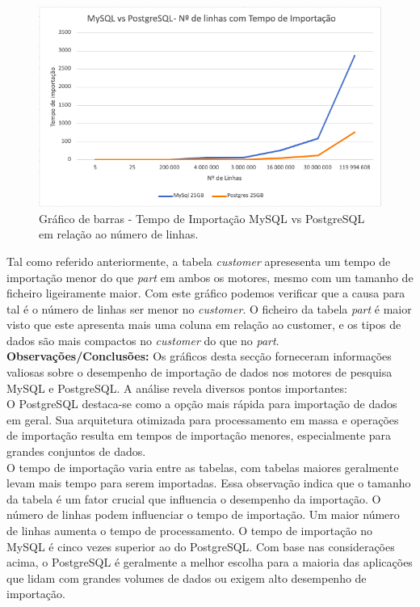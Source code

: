 \documentclass{article}
\begin{document}
\begin{figure}[H]
  \centering
  \includegraphics[width=\textwidth]{Graphs/RowsvsImportTime.png}
  \caption{Gráfico de barras - Tempo de Importação MySQL vs PostgreSQL em relação ao número de linhas.}
  \label{fig:row_import_time3}
\end{figure}

\quad Tal como referido anteriormente, a tabela \textit{customer} apresesenta um tempo de importação menor do que \textit{part} em ambos os motores, mesmo com um tamanho de ficheiro ligeiramente maior. Com este gráfico podemos verificar que a causa para tal é o número de linhas ser menor no \textit{customer}. O ficheiro da tabela \textit{part} é maior visto que este apresenta mais uma coluna em relação ao customer, e os tipos de dados são mais compactos no \textit{customer} do que no \textit{part}.\\

\textbf{Observações/Conclusões:}
Os gráficos desta secção forneceram informações valiosas sobre o desempenho de importação de dados nos motores de pesquisa MySQL e PostgreSQL. A análise revela diversos pontos importantes:\\
O PostgreSQL destaca-se como a opção mais rápida para importação de dados em geral. Sua arquitetura otimizada para processamento em massa e operações de importação resulta em tempos de importação menores, especialmente para grandes conjuntos de dados.\\
O tempo de importação varia entre as tabelas, com tabelas maiores geralmente levam mais tempo para serem importadas. Essa observação indica que o tamanho da tabela é um fator crucial que influencia o desempenho da importação. O número de linhas podem influenciar o tempo de importação. Um maior número de linhas aumenta o tempo de processamento.
O tempo de importação no MySQL é cinco vezes superior ao do PostgreSQL.
Com base nas considerações acima, o PostgreSQL é geralmente a melhor escolha para a maioria das aplicações que lidam com grandes volumes de dados ou exigem alto desempenho de importação.
\end{document}

